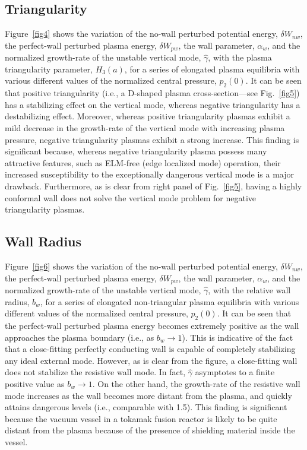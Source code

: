\documentclass[12pt,prb,aps]{revtex4-1}
\begin{document}
\subsection{Triangularity}
Figure~\ref{fig4} shows the variation of the no-wall perturbed potential energy, $\delta W_{nw}$, the perfect-wall perturbed plasma energy, $\delta W_{pw}$, the wall 
parameter, $\alpha_w$, and the normalized growth-rate of the unstable vertical mode, $\hat{\gamma}$, with the plasma triangularity parameter, $H_3(a)$,  for a series of
elongated plasma equilibria with various different values of the normalized central pressure, $p_2(0)$. It can be seen that
positive triangularity (i.e., a D-shaped plasma cross-section---see Fig.~\ref{fig5}) has a stabilizing effect on the vertical mode, whereas negative triangularity has
a destabilizing effect. Moreover, whereas positive triangularity plasmas exhibit a mild decrease in the growth-rate of the vertical mode with increasing plasma
pressure, negative triangularity plasmas exhibit a strong increase.\cite{guz} This finding is significant because, whereas negative triangularity plasma possess many attractive features,
such as ELM-free (edge localized mode) operation,\cite{guz} their increased susceptibility to the exceptionally dangerous vertical  mode is a major drawback. 
Furthermore, as is clear from right panel of Fig.~\ref{fig5}, having a highly conformal wall does not solve the vertical mode problem for negative triangularity plasmas. 

\subsection{Wall Radius}
Figure~\ref{fig6} shows the variation of the no-wall perturbed potential energy, $\delta W_{nw}$, the perfect-wall perturbed plasma energy, $\delta W_{pw}$, the wall 
parameter, $\alpha_w$, and the normalized growth-rate of the unstable vertical mode, $\hat{\gamma}$, with the relative wall radius, $b_w$,   for a series of
elongated non-triangular plasma equilibria with various different values of the normalized central pressure, $p_2(0)$. It can be seen that
the perfect-wall perturbed plasma energy becomes extremely positive as the wall approaches the plasma boundary (i.e., as $b_w\rightarrow 1$). This is
indicative of the fact that a close-fitting perfectly conducting wall is capable of completely stabilizing any ideal external mode.\cite{gs1} 
However, as is clear from the figure, a close-fitting wall does not stabilize the resistive wall mode. In fact, $\hat{\gamma}$ asymptotes to a finite positive
value as $b_w\rightarrow 1$. On the other hand, the growth-rate of the resistive wall  mode increases as the wall becomes more distant from the plasma,
and quickly attains dangerous levels (i.e., comparable with 1.5). This finding is significant because the vacuum vessel in a tokamak fusion reactor is
likely to be quite distant from the plasma because of the presence of shielding material inside the vessel. 
\end{document}
